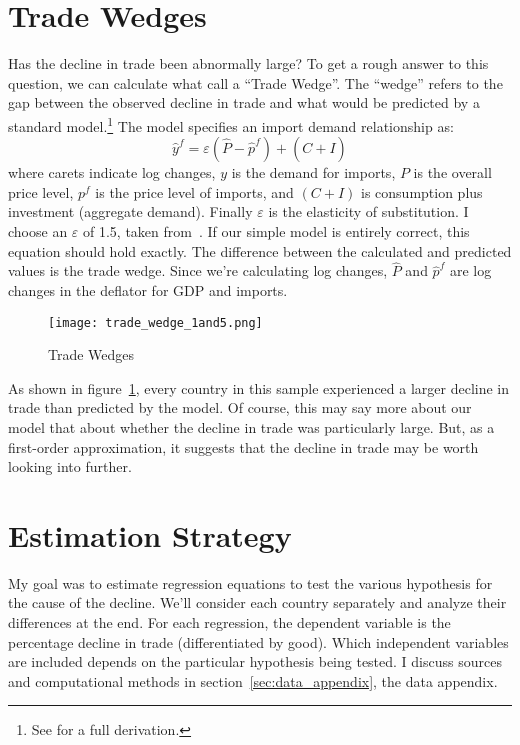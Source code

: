 \documentclass[11pt]{article}
\begin{document}
\section{Trade Wedges} %
\label{sec:trade_wedges}
  Has the decline in trade been abnormally large?  To get a rough answer to this question, we can calculate what \cite{llt:2010} call a ``Trade Wedge''.  The ``wedge'' refers to the gap between the observed decline in trade and what would be predicted by a standard model.\footnote{See \cite{llt:2010} for a full derivation.}  The model specifies an import demand relationship as:
  \begin{equation} \label{eq:trade_wedge}
      \hat{y}^f = \varepsilon(\hat{P} - \hat{p}^f) + (\hat{C + I})
  \end{equation}
  where carets indicate log changes, $y$ is the demand for imports, $P$ is the overall price level, $p^f$ is the price level of imports, and $(C + I)$ is consumption plus investment (aggregate demand).  Finally $\varepsilon$ is the elasticity of substitution. I choose an $\varepsilon$ of 1.5, taken from~\cite{llt:2010}. If our simple model is entirely correct, this equation should hold exactly.  The difference between the calculated and predicted values is the trade wedge.  Since we're calculating log changes, $\hat{P}$ and $\hat{p}^f$ are log changes in the deflator for GDP and imports.

  \begin{figure}
    \centering
      \texttt{[image: trade\_wedge\_1and5.png]}
    \caption{Trade Wedges}
    \label{fig:trade_wedge}
  \end{figure}

  As shown in figure~\ref{fig:trade_wedge}, every country in this sample experienced a larger decline in trade than predicted by the model.  Of course, this may say more about our model that about whether the decline in trade was particularly large.  But, as a first-order approximation, it suggests that the decline in trade may be worth looking into further.

\section{Estimation Strategy} %
\label{sec:estimation_strategy}
  My goal was to estimate regression equations to test the various hypothesis for the cause of the decline.  We'll consider each country separately and analyze their differences at the end.  For each regression, the dependent variable is the percentage decline in trade (differentiated by good).  Which independent variables are included depends on the particular hypothesis being tested.  I discuss sources and computational methods in section~\ref{sec:data_appendix}, the data appendix.
\end{document}
